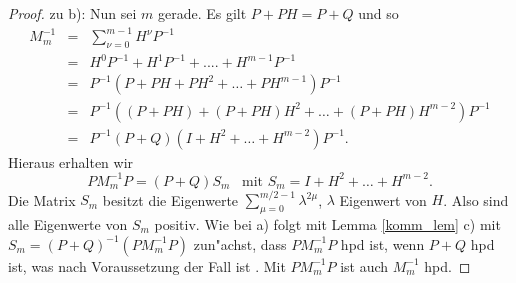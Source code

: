 \begin{proof}
\noindent zu b): Nun sei $m$ gerade. Es gilt $P+PH = P+Q$ und so
\begin{eqnarray*}
M_m^{-1}
     &=&\sum\limits_{\nu=0}^{m-1}H^\nu P^{-1}\\
     &=&H^0P^{-1}+H^1 P^{-1}+....+H^{m-1}P^{-1}\\
     &=& P^{-1}(P + PH + PH^2 + \ldots + PH^{m-1})P^{-1} \\
     &=& P^{-1}( (P + PH) + (P + PH)H^2 + \ldots + (P + PH)H^{m-2})P^{-1} \\
     &=& P^{-1}(P+Q)( I + H^2 + \ldots + H^{m-2})P^{-1}.
\end{eqnarray*}
Hieraus erhalten wir
\[
PM_{m}^{-1}P = (P+Q)S_m \enspace \mbox{ mit } S_m = I + H^2 + \ldots + H^{m-2}.
\]
Die Matrix $S_m$ besitzt die Eigenwerte $\sum_{\mu=0}^{m/2-1} \lambda^{2\mu}$, $\lambda$ Eigenwert von $H$.
Also sind alle Eigenwerte von $S_m$ positiv. Wie bei a) folgt mit Lemma \ref{komm_lem}
c) mit $S_m = (P+Q)^{-1}(PM_m^{-1}P)$ zun"achst, dass $PM_m^{-1}P$ hpd ist, wenn $P+Q$ hpd ist, was nach Voraussetzung der Fall ist .
Mit $PM_m^{-1}P$ ist auch $M_m^{-1}$ hpd.
\end{proof}


